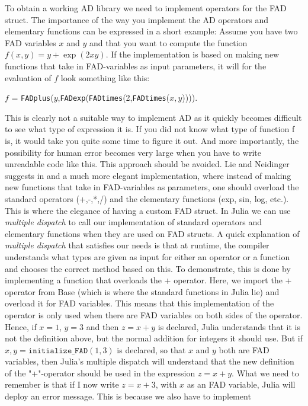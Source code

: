 To obtain a working AD library we need to implement operators for the FAD struct. The importance of the way you implement the AD operators and elementary functions can be expressed in a short example: Assume you have two FAD variables $x$ and $y$ and that you want to compute the function $f(x,y) = y+\exp(2xy)$. If the implementation is based on making new functions that take in FAD-variables as input parameters, it will for the evaluation of $f$ look something like this: 
\begin{center}
    $f$ = \texttt{FADplus}($y$,\texttt{FADexp}(\texttt{FADtimes}(2,\texttt{FADtimes}($x,y$)))).
\end{center}
This is clearly not a suitable way to implement AD as it quickly becomes difficult to see what type of expression it is. If you did not know what type of function f is, it would take you quite some time to figure it out. And more importantly, the possibility for human error becomes very large when you have to write unreadable code like this. This approach should be avoided. Lie and Neidinger suggests in \emph{\cite{lieMrstUrl}} and \emph{\cite{doi:10.1137/080743627}} a much more elegant implementation, where instead of making new functions that take in FAD-variables as parameters, one should overload the standard operators (+,-,*,/) and the elementary functions (exp, sin, log, etc.). This is where the elegance of having a custom FAD struct. In Julia we can use \emph{multiple dispatch} to call our implementation of standard operators and elementary functions when they are used on FAD structs. A quick explanation of \emph{multiple dispatch} that satisfies our needs is that at runtime, the compiler understands what types are given as input for either an operator or a function and chooses the correct method based on this. To demonstrate, this is done by implementing a function  
that overloads the + operator. Here, we import the + operator from Base (which is where the standard functions in Julia lie) and overload it for FAD variables. This means that this implementation of the operator is only used when there are FAD variables on both sides of the operator. Hence, if $x = 1$, $y = 3$ and then $z = x+y$ is declared, Julia understands that it is not the definition above, but the normal addition for integers it should use. But if $x,y = \texttt{initialize\_FAD}(1,3)$ is declared, so that $x$ and $y$ both are FAD variables, then Julia's multiple dispatch will understand that the new definition of the "+"-operator should be used in the expression $z = x+y$. What we need to remember is that if I now write $z = x + 3$, with $x$ as an FAD variable, Julia will deploy an error message. This is because we also have to implement
